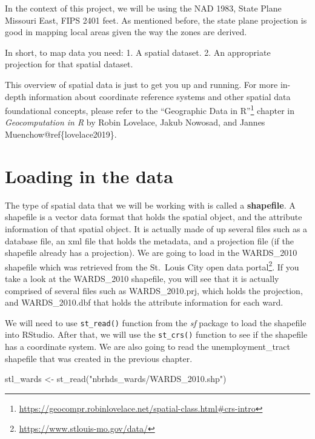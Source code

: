 \documentclass[
  krantz2]{krantz}
\makeatletter
\newenvironment{Shaded}{\begin{snugshade}}{\end{snugshade}}
\newcommand{\FunctionTok}[1]{\textcolor[rgb]{0,0,0}{#1}}
\newcommand{\NormalTok}[1]{#1}
\newcommand{\OtherTok}[1]{\textcolor[rgb]{0.37,0.37,0.37}{#1}}
\newcommand{\StringTok}[1]{\textcolor[rgb]{0.5,0.5,0.5}{#1}}
\newenvironment{kframe}{%
\medskip{}
\setlength{\fboxsep}{.8em}
 \def\at@end@of@kframe{}%
 \ifinner\ifhmode%
  \def\at@end@of@kframe{\end{minipage}}%
  \begin{minipage}{\columnwidth}%
 \fi\fi%
 \def\FrameCommand##1{\hskip\@totalleftmargin \hskip-\fboxsep
 \colorbox{shadecolor}{##1}\hskip-\fboxsep
     \hskip-\linewidth \hskip-\@totalleftmargin \hskip\columnwidth}%
 \MakeFramed {\advance\hsize-\width
   \@totalleftmargin\z@ \linewidth\hsize
   \@setminipage}}%
 {\par\unskip\endMakeFramed%
 \at@end@of@kframe}
\renewenvironment{Shaded}{\begin{kframe}}{\end{kframe}}
\makeatother
\begin{document}
In the context of this project, we will be using the NAD 1983, State Plane Missouri East, FIPS 2401 feet. As mentioned before, the state plane projection is good in mapping local areas given the way the zones are derived.

In short, to map data you need:
1. A spatial dataset.
2. An appropriate projection for that spatial dataset.

This overview of spatial data is just to get you up and running. For more in-depth information about coordinate reference systems and other spatial data foundational concepts, please refer to the ``Geographic Data in R''\footnote{\url{https://geocompr.robinlovelace.net/spatial-class.html\#crs-intro}} chapter in \emph{Geocomputation in R} by Robin Lovelace, Jakub Nowosad, and Jannes Muenchow@ref\{lovelace2019\}.

\hypertarget{loading-in-the-data}{%
\section{Loading in the data}\label{loading-in-the-data}}

The type of spatial data that we will be working with is called a \textbf{shapefile}. A shapefile is a vector data format that holds the spatial object, and the attribute information of that spatial object. It is actually made of up several files such as a database file, an xml file that holds the metadata, and a projection file (if the shapefile already has a projection). We are going to load in the WARDS\_2010 shapefile which was retrieved from the St.~Louis City open data portal\footnote{\url{https://www.stlouis-mo.gov/data/}}. If you take a look at the WARDS\_2010 shapefile, you will see that it is actually comprised of several files such as WARDS\_2010.prj, which holds the projection, and WARDS\_2010.dbf that holds the attribute information for each ward.

We will need to use \texttt{st\_read()} function from the \emph{sf} package to load the shapefile into RStudio. After that, we will use the \texttt{st\_crs()} function to see if the shapefile has a coordinate system. We are also going to read the unemployment\_tract shapefile that was created in the previous chapter.

\begin{Shaded}
\begin{Highlighting}[]
\NormalTok{stl\_wards }\OtherTok{\textless{}{-}} \FunctionTok{st\_read}\NormalTok{(}\StringTok{"nbrhds\_wards/WARDS\_2010.shp"}\NormalTok{) }
\end{Highlighting}
\end{Shaded}
\end{document}
